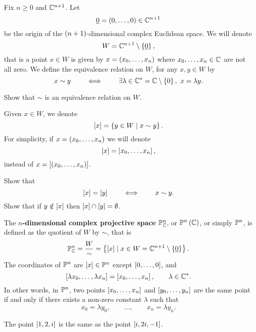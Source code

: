 \begin{notation}
Fix $ n \ge 0 $ and $ \C^{n + 1} $. Let
$$ \underline{0} = \rb{0, \dots, 0} \in \C^{n + 1} $$
be the origin of the $ \rb{n + 1} $-dimensional complex Euclidean space. We will denote
$$ W = \C^{n + 1} \setminus \cb{\underline{0}}, $$
that is a point $ x \in W $ is given by $ x = \rb{x_0, \dots, x_n} $ where $ x_0, \dots, x_n \in \C $ are not all zero. We define the equivalence relation on $ W $, for any $ x, y \in W $ by
$$ x \sim y \qquad \iff \qquad \exists \lambda \in \C^* = \C \setminus \cb{0}, \ x = \lambda y. $$
\end{notation}

\begin{exercise}
Show that $ \sim $ is an equivalence relation on $ W $.
\end{exercise}

\begin{notation}
Given $ x \in W $, we denote
$$ \sb{x} = \cb{y \in W \mid x \sim y}. $$
For simplicity, if $ x = \rb{x_0, \dots, x_n} $ we will denote
$$ \sb{x} = \sb{x_0, \dots, x_n}, $$
instead of $ x = \sb{\rb{x_0, \dots, x_n}} $.
\end{notation}

\begin{exercise}
Show that
$$ \sb{x} = \sb{y} \qquad \iff \qquad x \sim y. $$
Show that if $ y \notin \sb{x} $ then $ \sb{x} \cap \sb{y} = \emptyset $.
\end{exercise}

\begin{definition}
The \textbf{$ n $-dimensional complex projective space} $ \P_\C^n $, or $ \P^n\rb{\C} $, or simply $ \P^n $, is defined as the quotient of $ W $ by $ \sim $, that is
$$ \P_\C^n = \dfrac{W}{\sim} = \cb{\sb{x} \mid x \in W = \C^{n + 1} \setminus \cb{\underline{0}}}. $$
The coordinates of $ \P^n $ are $ \sb{x} \in \P^n $ except $ \sb{0, \dots, 0} $, and
$$ \sb{\lambda x_0, \dots, \lambda x_n} = \sb{x_0, \dots, x_n}, \qquad \lambda \in \C^*. $$
In other words, in $ \P^n $, two points $ \sb{x_0, \dots, x_n} $ and $ \sb{y_0, \dots, y_n} $ are the same point if and only if there exists a non-zero constant $ \lambda $ such that
$$ x_0 = \lambda y_0, \qquad \dots, \qquad x_n = \lambda y_n. $$
\end{definition}

\begin{example}
The point $ \sb{1, 2, i} $ is the same as the point $ \sb{i, 2i, -1} $.
\end{example}

